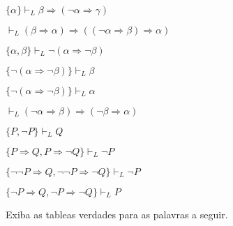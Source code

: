 \begin{exerList}
  \item $\{\alpha\} \vdash_L \beta \Rightarrow (\neg \alpha \Rightarrow \gamma)$
  \item $\vdash_L (\beta \Rightarrow \alpha) \Rightarrow ((\neg \alpha \Rightarrow \beta) \Rightarrow \alpha)$
  \item $\{\alpha, \beta\} \vdash_L \neg (\alpha \Rightarrow \neg \beta)$
  \item $\{\neg (\alpha \Rightarrow \neg \beta)\} \vdash_L \beta$
  \item $\{\neg (\alpha \Rightarrow \neg \beta)\} \vdash_L \alpha$
  \item $\vdash_L (\neg \alpha \Rightarrow \beta) \Rightarrow (\neg \beta \Rightarrow \alpha)$
  \item $\{P, \neg P\} \vdash_L Q$
  \item $\{P \Rightarrow Q, P \Rightarrow \neg Q\} \vdash_L \neg P$
  \item $\{\neg \neg P \Rightarrow Q, \neg \neg P \Rightarrow \neg Q\} \vdash_L \neg P$
  \item $\{\neg P \Rightarrow Q, \neg P \Rightarrow \neg Q\} \vdash_L P$
\end{exerList}


\begin{questao}\label{test:LPro6}
  Exiba as tableas verdades para as palavras a seguir.
\end{questao}

